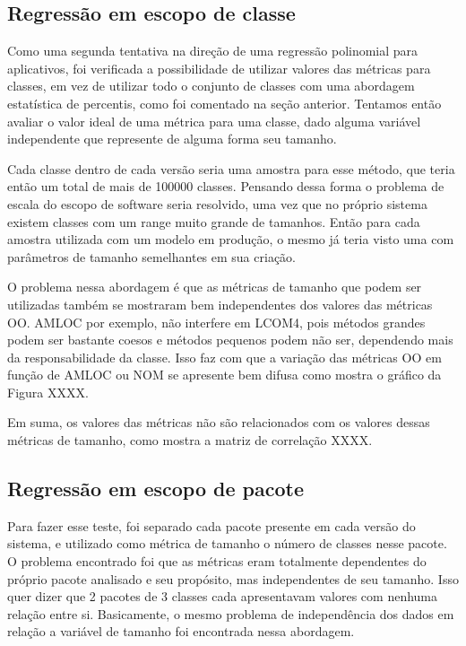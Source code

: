 \subsection{Regressão em escopo de classe}

Como uma segunda tentativa na direção de uma regressão polinomial para aplicativos, foi verificada a possibilidade de utilizar valores das métricas para classes, em vez de utilizar todo o conjunto de classes com uma abordagem estatística de percentis, como foi comentado na seção anterior. Tentamos então avaliar o valor ideal de uma métrica para uma classe, dado alguma variável independente que represente de alguma forma seu tamanho.

Cada classe dentro de cada versão seria uma amostra para esse método, que teria então um total de mais de 100000 classes. Pensando dessa forma o problema de escala do escopo de software seria resolvido, uma vez que no próprio sistema existem classes com um range muito grande de tamanhos. Então para cada amostra utilizada com um modelo em produção, o mesmo já teria visto uma com parâmetros de tamanho semelhantes em sua criação. 

O problema nessa abordagem é que as métricas de tamanho que podem ser utilizadas também se mostraram bem independentes dos valores das métricas OO. AMLOC por exemplo, não interfere em LCOM4, pois métodos grandes podem ser bastante coesos e métodos pequenos podem não ser, dependendo mais da responsabilidade da classe. Isso faz com que a variação das métricas OO em função de AMLOC ou NOM se apresente bem difusa como mostra o gráfico da Figura XXXX.

Em suma, os valores das métricas não são relacionados com os valores dessas métricas de tamanho, como mostra a matriz de correlação XXXX.

\subsection{Regressão em escopo de pacote}

Para fazer esse teste, foi separado cada pacote presente em cada versão do sistema, e utilizado como métrica de tamanho o número de classes nesse pacote. O problema encontrado foi que as métricas eram totalmente dependentes do próprio pacote analisado e seu propósito, mas independentes de seu tamanho. Isso quer dizer que 2 pacotes de 3 classes cada apresentavam valores com nenhuma relação entre si. Basicamente, o mesmo problema de independência dos dados em relação a variável de tamanho foi encontrada nessa abordagem.

